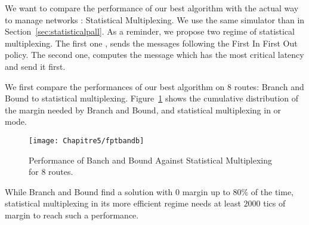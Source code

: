 We want to compare the performance of our best algorithm with the actual way to manage networks : Statistical Multiplexing. We use the same simulator than in Section~\ref{sec:statisticalpall}. As a reminder, we propose two regime of statistical multiplexing. The first one \FIFO, sends the messages following the First In First Out policy. The second one, \critdead computes the message which has the most critical latency and send it first. 

We first compare the performances of our best algorithm on $8$ routes: Branch and Bound to statistical multiplexing. Figure~\ref{fig:fptbandb} shows the cumulative distribution of the margin needed by Branch and Bound, and statistical multiplexing in \FIFO or \critdead mode. 

\begin{center}

\begin{figure}[h]
  \centering
\texttt{[image: Chapitre5/fptbandb]}
\caption{Performance of Banch and Bound Against Statistical Multiplexing for $8$ routes.}
\label{fig:fptbandb}
\end{figure}
\end{center}

While Branch and Bound find a solution with $0$ margin up to $80\%$ of the time, statistical multiplexing in its more efficient regime needs at least $2000$ tics of margin to reach such a performance. 


